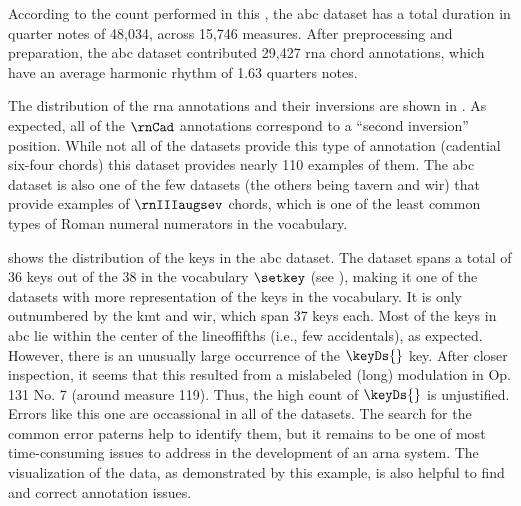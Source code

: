 
According to the count performed in this \thesisdiss{}, the
\gls{abc} dataset has a total duration in quarter notes of
48,034, across 15,746 measures. After preprocessing and
preparation, the \gls{abc} dataset contributed 29,427
\gls{rna} chord annotations, which have an average harmonic
rhythm of 1.63 \glspl{quarter} notes.

The distribution of the \gls{rna} annotations and their
inversions are shown in . As
expected, all of the $\rnCad$ annotations correspond to a
``second inversion'' position. While not all of the datasets
provide this type of annotation (cadential six-four chords)
this dataset provides nearly 110 examples of them. The
\gls{abc} dataset is also one of the few datasets (the
others being \gls{tavern} and \gls{wir}) that provide
examples of $\rnIIIaugsev$ chords, which is one of the least
common types of Roman numeral numerators in the vocabulary.



 shows the distribution of the keys
in the \gls{abc} dataset. The dataset spans a total of 36
keys out of the 38 in the vocabulary $\setkey$ (see
), making it one of the
datasets with more representation of the keys in the
vocabulary. It is only outnumbered by the \gls{kmt} and
\gls{wir}, which span 37 keys each. Most of the keys in
\gls{abc} lie within the center of the \gls{lineoffifths}
(i.e., few accidentals), as expected. However, there is an
unusually large occurrence of the $\keyDs{}$ key. After
closer inspection, it seems that this resulted from a
mislabeled (long) modulation in Op. 131 No. 7 (around
measure 119). Thus, the high count of $\keyDs{}$ is
unjustified. Errors like this one are occassional in all of
the datasets. The search for the common error paterns help
to identify them, but it remains to be one of most
time-consuming issues to address in the development of an
\gls{arna} system. The visualization of the data, as
demonstrated by this example, is also helpful to find and
correct annotation issues.



